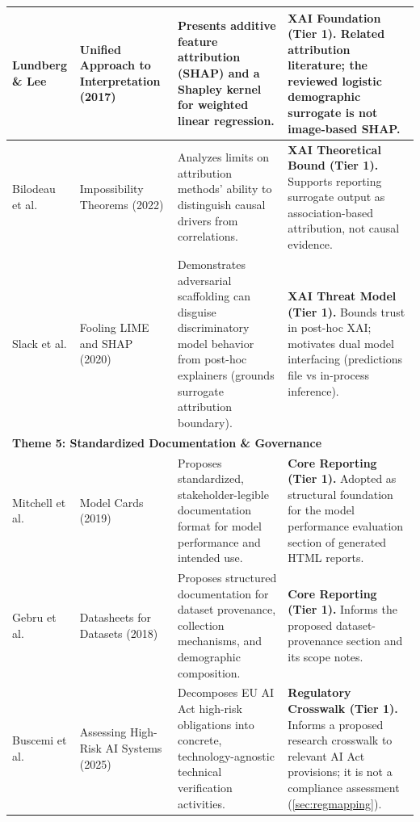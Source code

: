 \begin{center}
\begin{longtable}{|p{2.2cm}|p{2.6cm}|p{4.4cm}|p{4.4cm}|}
Lundberg \& Lee \cite{lundberg2017unified} &
Unified Approach to Interpretation (2017) &
Presents additive feature attribution (SHAP) and a Shapley kernel for weighted linear regression. &
\textbf{XAI Foundation (Tier 1).} Related attribution literature; the reviewed logistic demographic surrogate is not image-based SHAP. \\
\hline

Bilodeau et al. \cite{bilodeau2022impossibility} &
Impossibility Theorems (2022) &
Analyzes limits on attribution methods' ability to distinguish causal drivers from correlations. &
\textbf{XAI Theoretical Bound (Tier 1).} Supports reporting surrogate output as association-based attribution, not causal evidence. \\
\hline

Slack et al. \cite{slack2020fooling} &
Fooling LIME and SHAP (2020) &
Demonstrates adversarial scaffolding can disguise discriminatory model behavior from post-hoc explainers (grounds surrogate attribution boundary). &
\textbf{XAI Threat Model (Tier 1).} Bounds trust in post-hoc XAI; motivates dual model interfacing (predictions file vs in-process inference). \\
\hline

\multicolumn{4}{|l|}{\textbf{Theme 5: Standardized Documentation \& Governance}} \\
\hline
Mitchell et al. \cite{mitchell2019modelcards} &
Model Cards (2019) &
Proposes standardized, stakeholder-legible documentation format for model performance and intended use. &
\textbf{Core Reporting (Tier 1).} Adopted as structural foundation for the model performance evaluation section of generated HTML reports. \\
\hline

Gebru et al. \cite{gebru2018datasheets} &
Datasheets for Datasets (2018) &
Proposes structured documentation for dataset provenance, collection mechanisms, and demographic composition. &
\textbf{Core Reporting (Tier 1).} Informs the proposed dataset-provenance section and its scope notes. \\
\hline

Buscemi et al. \cite{buscemi2025assessing} &
Assessing High-Risk AI Systems (2025) &
Decomposes EU AI Act high-risk obligations into concrete, technology-agnostic technical verification activities. &
\textbf{Regulatory Crosswalk (Tier 1).} Informs a proposed research crosswalk to relevant AI Act provisions; it is not a compliance assessment (\cref{sec:regmapping}). \\
\hline


\end{longtable}
\end{center}
